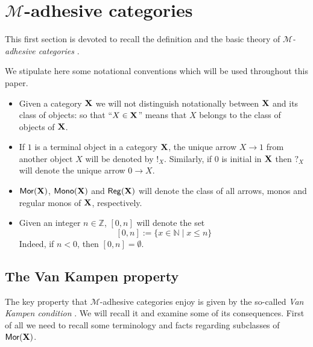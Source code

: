 

\chapter{$\mathcal{M}$-adhesive categories}

This first section is devoted to recall the definition and the basic theory of \emph{$\mathcal{M}$-adhesive categories} \cite{azzi2019essence,ehrig2012,ehrig2014adhesive,lack2005adhesive}. 

\begin{notation} 
We stipulate here some notational conventions which will be used throughout this paper. 
\begin{itemize}\item 
	Given a category $\textbf {\textup{X}}$ we will not distinguish notationally between $\textbf {\textup{X}}$ and its class of objects: so that ``$X\in \textbf {\textup{X}}$'' means that $X$ belongs to the class of objects of $\textbf {\textup{X}}$.  
	\item 
	If $1$ is a terminal object in a category $\textbf {\textup{X}}$,  the unique arrow $X\to 1$ from another object $X$ will be denoted by $!_X$. Similarly, if $0$ is initial in $\textbf {\textup{X}}$ then $?_X$ will denote the unique arrow $0\to X$. %
	\item  $\mathsf{Mor}(\textbf {\textup{X}})$, $\mathsf{Mono}(\textbf {\textup{X}})$ and $\mathsf{Reg}(\textbf {\textup{X}})$ will denote the class of all arrows, monos and regular monos of $\textbf {\textup{X}}$, respectively.
	
	\item Given an integer $n\in \mathbb{Z}$, $[0,n]$ will denote the set
	\[[0,n]:=\{x\in \mathbb{N}\mid x\leq n\}\] 
	Indeed, if $n<0$, then $[0,n]=\emptyset$.
\end{itemize}
\end{notation}


\section{The Van Kampen property}
The key property that $\mathcal{M}$-adhesive categories enjoy is given by  the so-called \emph{Van Kampen condition} \cite{brown1997van,johnstone2007quasitoposes,lack2005adhesive}. We will recall it and examine some of its consequences. First of all we need to recall some terminology and facts regarding subclasses of $\mathsf{Mor}(\textbf {\textup{X}})$.


